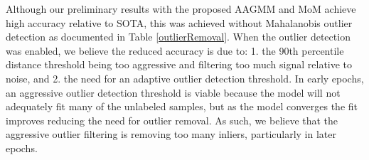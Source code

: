 \documentclass[10pt,twocolumn,letterpaper]{article}
\begin{document}
Although our preliminary results with the proposed AAGMM and MoM achieve high accuracy relative to SOTA, this was achieved without Mahalanobis outlier detection as documented in Table \ref{outlierRemoval}. 
When the outlier detection was enabled, we believe the reduced accuracy is due to: 1. the 90th percentile distance threshold being too aggressive and filtering too much signal relative to noise, and 2. the need for an adaptive outlier detection threshold. 
In early epochs, an aggressive outlier detection threshold is viable because the model will not adequately fit many of the unlabeled samples, but as the model converges the fit improves reducing the need for outlier removal.  As such, we believe that the aggressive outlier filtering is removing too many inliers, particularly in later epochs. 

\end{document}
